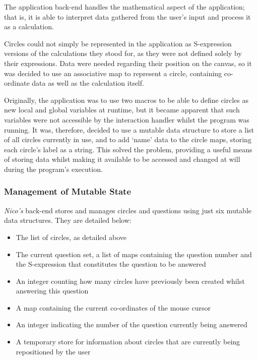 \documentclass[12pt,twoside,notitlepage,xetex]{report}
\begin{document}
The application back-end handles the mathematical aspect of the application;
that is, it is able to interpret data gathered from the user's input and
process it as a calculation.

Circles could not simply be represented in the application as S-expression versions of the calculations they stood for, as they were not defined solely by their expressions.  Data were needed regarding their position on the canvas, so it was decided to use an associative map to represent a circle, containing co-ordinate data as well as the calculation itself.

Originally, the application was to use two macros to be able to define circles as new local and global variables at runtime, but it became apparent that such variables were not accessible by the interaction handler whilst the program was running.  It was, therefore, decided to use a mutable data structure to store a list of all circles currently in use, and to add `name' data to the circle maps, storing each circle's label as a string.  This solved the problem, providing a useful means of storing data whilst making it available to be accessed and changed at will during the program's execution.

\subsubsection{Management of Mutable State}

\emph{Nico's} back-end stores and manages circles and questions using just six
mutable data structures.  They are detailed below:
\begin{itemize}
\item The list of circles, as detailed above
\item The current question set, a list of maps containing the question number and the S-expression that constitutes the question to be answered
\item An integer counting how many circles have previously been created whilst answering this question
\item A map containing the current co-ordinates of the mouse cursor
\item An integer indicating the number of the question currently being answered
\item A temporary store for information about circles that are currently being repositioned by the user
\end{itemize}
\end{document}
